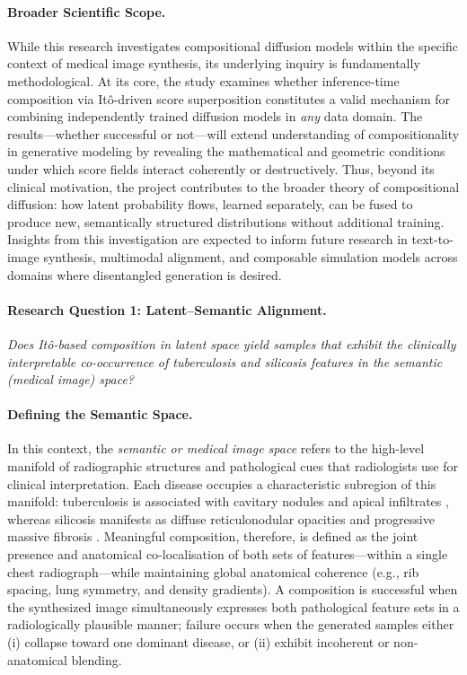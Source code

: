 \paragraph{Broader Scientific Scope.}
While this research investigates compositional diffusion models within the specific context of medical image synthesis, its underlying inquiry is fundamentally methodological.  
At its core, the study examines whether inference-time composition via Itô-driven score superposition constitutes a valid mechanism for combining independently trained diffusion models in \emph{any} data domain.  
The results—whether successful or not—will extend understanding of compositionality in generative modeling by revealing the mathematical and geometric conditions under which score fields interact coherently or destructively.  
Thus, beyond its clinical motivation, the project contributes to the broader theory of compositional diffusion: how latent probability flows, learned separately, can be fused to produce new, semantically structured distributions without additional training.  
Insights from this investigation are expected to inform future research in text-to-image synthesis, multimodal alignment, and composable simulation models across domains where disentangled generation is desired.

\paragraph{Research Question 1: Latent–Semantic Alignment.}
\emph{Does Itô-based composition in latent space yield samples that exhibit the clinically interpretable co-occurrence of tuberculosis and silicosis features in the semantic (medical image) space?}

\paragraph{Defining the Semantic Space.}
In this context, the \emph{semantic or medical image space} refers to the high-level manifold of radiographic structures and pathological cues that radiologists use for clinical interpretation.  
Each disease occupies a characteristic subregion of this manifold: tuberculosis is associated with cavitary nodules and apical infiltrates \citep{urbanowski2020cavitary}, whereas silicosis manifests as diffuse reticulonodular opacities and progressive massive fibrosis \citep{radswiki2025silicosis, weerakkody2025pmf}.  
Meaningful composition, therefore, is defined as the joint presence and anatomical co-localisation of both sets of features—within a single chest radiograph—while maintaining global anatomical coherence (e.g., rib spacing, lung symmetry, and density gradients).  
A composition is successful when the synthesized image simultaneously expresses both pathological feature sets in a radiologically plausible manner; failure occurs when the generated samples either (i) collapse toward one dominant disease, or (ii) exhibit incoherent or non-anatomical blending.

